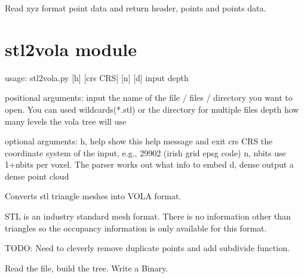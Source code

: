 \documentclass[letterpaper,10pt,english]{sphinxmanual}
\begin{document}
\begin{fulllineitems}
\label{\detokenize{xyz2vola:xyz2vola.parse_xyz}}
Read xyz format point data and return header, points and points data.

\end{fulllineitems}



\section{stl2vola module}
\label{\detokenize{stl2vola:stl2vola-module}}\label{\detokenize{stl2vola::doc}}
\begin{sphinxVerbatim}[commandchars=\\\{\}]
usage: stl2vola.py [\PYGZhy{}h] [\PYGZhy{}\PYGZhy{}crs CRS] [\PYGZhy{}n] [\PYGZhy{}d] input depth

positional arguments:
  input        the name of the file / files / directory you want to open. You
               can used wildcards(*.stl) or the directory for multiple files
  depth        how many levels the vola tree will use

optional arguments:
  \PYGZhy{}h, \PYGZhy{}\PYGZhy{}help   show this help message and exit
  \PYGZhy{}\PYGZhy{}crs CRS    the coordinate system of the input, e.g., 29902 (irish grid
               epsg code)
  \PYGZhy{}n, \PYGZhy{}\PYGZhy{}nbits  use 1+nbits per voxel. The parser works out what info to embed
  \PYGZhy{}d, \PYGZhy{}\PYGZhy{}dense  output a dense point cloud
\end{sphinxVerbatim}
\label{\detokenize{stl2vola:module-stl2vola}}
Converts stl triangle meshes into VOLA format.

STL is an industry standard mesh format. There is no information other than
triangles so the occupancy information is only available for this format.

TODO: Need to cleverly remove duplicate points and add subdivide function.

\begin{fulllineitems}
\label{\detokenize{stl2vola:stl2vola.main}}
Read the file, build the tree. Write a Binary.

\end{fulllineitems}
\end{document}
